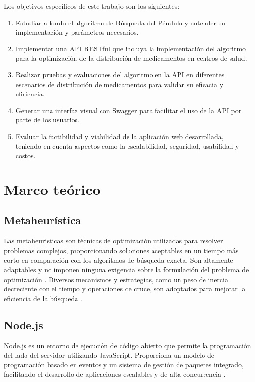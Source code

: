 \documentclass[conference]{IEEEtran}
\begin{document}
Los objetivos específicos de este trabajo son los siguientes:
\begin{enumerate}
    \item Estudiar a fondo el algoritmo de Búsqueda del Péndulo y entender su implementación y parámetros necesarios.
    \item Implementar una API RESTful que incluya la implementación del algoritmo para la optimización de la distribución de medicamentos en centros de salud.
    \item Realizar pruebas y evaluaciones del algoritmo en la API en diferentes escenarios de distribución de medicamentos para validar su eficacia y eficiencia.
    \item Generar una interfaz visual con Swagger para facilitar el uso de la API por parte de los usuarios.
    \item Evaluar la factibilidad y viabilidad de la aplicación web desarrollada, teniendo en cuenta aspectos como la escalabilidad, seguridad, usabilidad y costos.
\end{enumerate}

\section{Marco teórico}
\label{sec:MT}

\subsection{Metaheurística}
Las metaheurísticas son técnicas de optimización utilizadas para resolver problemas complejos, proporcionando soluciones aceptables en un tiempo más corto en comparación con los algoritmos de búsqueda exacta. Son altamente adaptables y no imponen ninguna exigencia sobre la formulación del problema de optimización \cite{soerensen2010}. Diversos mecanismos y estrategias, como un peso de inercia decreciente con el tiempo y operaciones de cruce, son adoptados para mejorar la eficiencia de la búsqueda \cite{eberhart2000, bansal2011, elkhateeb2013, yang2011, sarangi2016, binkley2008}.

\subsection{Node.js}
Node.js es un entorno de ejecución de código abierto que permite la programación del lado del servidor utilizando JavaScript. Proporciona un modelo de programación basado en eventos y un sistema de gestión de paquetes integrado, facilitando el desarrollo de aplicaciones escalables y de alta concurrencia \cite{shah2017}.
\end{document}
